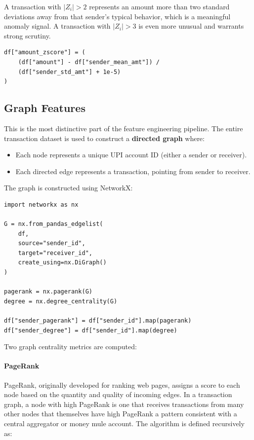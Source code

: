 A transaction with $|Z_i| > 2$ represents an amount more than two standard deviations away from that sender's typical behavior, which is a meaningful anomaly signal. A transaction with $|Z_i| > 3$ is even more unusual and warrants strong scrutiny.

\begin{lstlisting}[caption={Z-score anomaly feature computation}, label={lst:zscore}]
df["amount_zscore"] = (
    (df["amount"] - df["sender_mean_amt"]) /
    (df["sender_std_amt"] + 1e-5)
)
\end{lstlisting}

\subsection{Graph Features}

\label{sec:graph}

This is the most distinctive part of the feature engineering pipeline. The entire transaction dataset is used to construct a \textbf{directed graph} where:
\begin{itemize}
    \item Each node represents a unique UPI account ID (either a sender or receiver).
    \item Each directed edge represents a transaction, pointing from sender to receiver.
\end{itemize}

The graph is constructed using NetworkX:

\begin{lstlisting}[caption={Directed transaction graph construction}, label={lst:graph}]
import networkx as nx

G = nx.from_pandas_edgelist(
    df,
    source="sender_id",
    target="receiver_id",
    create_using=nx.DiGraph()
)

pagerank = nx.pagerank(G)
degree = nx.degree_centrality(G)

df["sender_pagerank"] = df["sender_id"].map(pagerank)
df["sender_degree"] = df["sender_id"].map(degree)
\end{lstlisting}

Two graph centrality metrics are computed:

\paragraph{PageRank} PageRank, originally developed for ranking web pages, assigns a score to each node based on the quantity and quality of incoming edges. In a transaction graph, a node with high PageRank is one that receives transactions from many other nodes that themselves have high PageRank a pattern consistent with a central aggregator or money mule account. The algorithm is defined recursively as:

